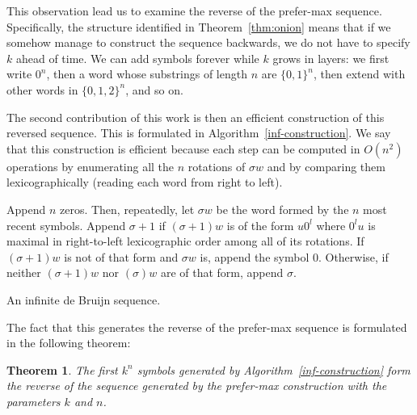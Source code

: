 \documentclass{article}
\newtheorem{theorem}{Theorem}
\theoremstyle{definition}
\newcommand{\N}{{\mathbb{N}}}
\begin{document}
%	

This observation lead us to examine the reverse of the prefer-max sequence. Specifically, the structure identified in Theorem~\ref{thm:onion} means that if we somehow manage to construct the sequence backwards, we do not have to specify $k$ ahead of time. We can add symbols forever while $k$ grows in layers: we first write $0^n$, then a word whose substrings of length $n$ are $\{0,1\}^n$, then extend with other words in $\{0,1,2\}^n$, and so on.

The second contribution of this work is then an efficient construction of this reversed sequence. This is formulated in Algorithm~\ref{inf-construction}. We say that this construction is efficient because each step can be computed in $O(n^2)$ operations by enumerating all the $n$ rotations of $\sigma w$ and by comparing them lexicographically (reading each word from right to left).


\begin{algorithm}[!h]
	Append $n$ zeros. Then, repeatedly, let $\sigma w$ be the word formed by the $n$ most recent symbols. Append $\sigma+1$ if $(\sigma+1)w$ is of the form $u0^l$ where $0^lu$ is maximal in right-to-left lexicographic order among all of its rotations. If $(\sigma+1)w$ is not of that form and $\sigma w$ is, append the symbol $0$. Otherwise, if neither $(\sigma+1)w$ nor $(\sigma)w$ are of that form, append $\sigma$.
	\caption{An infinite de Bruijn sequence.}
	\label{inf-construction}
\end{algorithm}

The fact that this generates the reverse of the prefer-max sequence is formulated in the following theorem:
 
\begin{theorem} 
The first $k^n$ symbols generated by Algorithm~\ref{inf-construction} form the reverse of the sequence generated by the prefer-max construction with the parameters $k$ and $n$.	
\end{theorem} 
\end{document}
